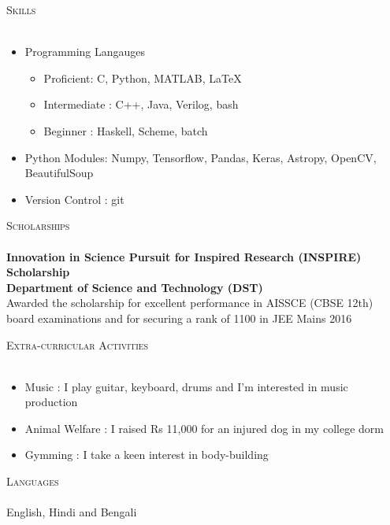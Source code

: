 \documentclass[a4paper]{article}
\newcommand{\lineunder} {
    \vspace*{-8pt} \\
    \hspace*{-18pt} \hrulefill \\
}
\newcommand{\header} [1] {
    {\hspace*{-18pt}\vspace*{6pt} \textsc{#1}}
    \vspace*{-6pt} \lineunder
}
\begin{document}
\newpage

\header{Skills}
\begin{itemize}
	\item Programming Langauges
	\begin{itemize}
	    \item Proficient: C, Python, MATLAB, \LaTeX
	    \item Intermediate : C++, Java, Verilog, bash
	    \item Beginner : Haskell, Scheme, batch
	\end{itemize}
	\item Python Modules: Numpy, Tensorflow, Pandas, Keras, Astropy, OpenCV, BeautifulSoup
	\item Version Control : git
\end{itemize}
\vspace{2mm}

\header{Scholarships}
\textbf{Innovation in Science Pursuit for Inspired Research (INSPIRE) Scholarship} \\ \textbf{Department of Science and Technology (DST)}\\ \vspace{2mm}
Awarded the scholarship for excellent performance in AISSCE (CBSE 12th) board examinations and for securing a rank of 1100 in JEE Mains 2016\\
\vspace*{2mm}

\header{Extra-curricular Activities}
\begin{itemize}
    \item Music : I play guitar, keyboard, drums and I'm interested in music production
    \item Animal Welfare : I raised Rs 11,000 for an injured dog in my college dorm
    \item Gymming : I take a keen interest in body-building
\end{itemize}
\vspace*{2mm}

\header{Languages}
English, Hindi and Bengali
\vspace*{2mm}

\ 
\end{document}
